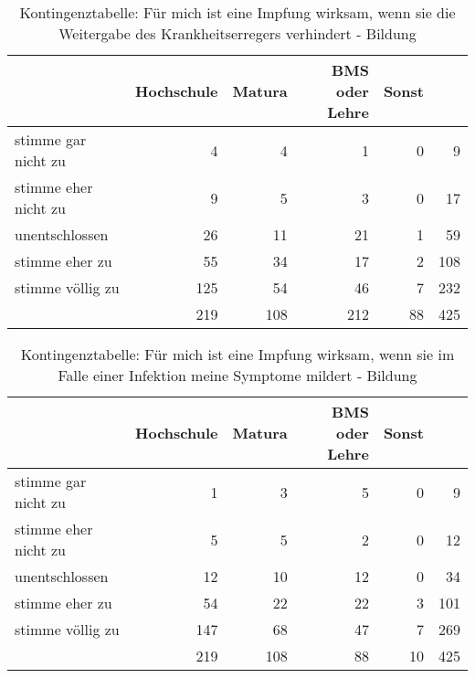 \begin{table}[ht!]
    \centering
    \begin{tabular} {l | r r r r | r}
        & Hochschule & Matura & BMS oder Lehre & Sonst & \\
        \hline
        stimme gar nicht zu & 4 & 4 & 1 & 0 & 9 \\
        stimme eher nicht zu & 9 & 5 & 3 & 0 & 17 \\
        unentschlossen & 26 & 11 & 21 & 1 & 59 \\
        stimme eher zu & 55 & 34 & 17 & 2 & 108 \\
        stimme völlig zu & 125 & 54 & 46 & 7 & 232 \\
        \hline
        & 219 & 108 & 212 & 88 & 425 \\
    \end{tabular}
    \caption{Kontingenztabelle: Für mich ist eine Impfung wirksam, wenn sie die Weitergabe des Krankheitserregers verhindert - Bildung}
    \label{tab:chi_weitergabe_bildung}
\end{table}

\begin{table}[ht!]
    \centering
    \begin{tabular} {l | r r r r | r}
        & Hochschule & Matura & BMS oder Lehre & Sonst & \\
        \hline
        stimme gar nicht zu & 1 & 3 & 5 & 0 & 9 \\
        stimme eher nicht zu & 5 & 5 & 2 & 0 & 12 \\
        unentschlossen & 12 & 10 & 12 & 0 & 34 \\
        stimme eher zu & 54 & 22 & 22 & 3 & 101 \\
        stimme völlig zu & 147 & 68 & 47 & 7 & 269 \\
        \hline
        & 219 & 108 & 88 & 10 & 425
    \end{tabular}
    \caption{Kontingenztabelle: Für mich ist eine Impfung wirksam, wenn sie im Falle einer Infektion meine Symptome mildert - Bildung}
    \label{tab:chi_symptome_bildung}
\end{table}


